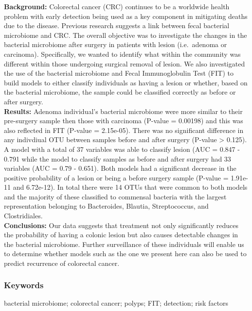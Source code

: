 \documentclass[12pt,]{article}
\begin{document}
\textbf{Background:} Colorectal cancer (CRC) continues to be a worldwide
health problem with early detection being used as a key component in
mitigating deaths due to the disease. Previous research suggests a link
between fecal bacterial microbiome and CRC. The overall objective was to
investigate the changes in the bacterial microbiome after surgery in
patients with lesion (i.e.~adenoma or carcinoma). Specifically, we
wanted to identify what within the community was different within those
undergoing surgical removal of lesion. We also investigated the use of
the bacterial microbiome and Fecal Immunoglobulin Test (FIT) to build
models to either classify individuals as having a lesion or whether,
based on the bacterial microbiome, the sample could be classified
correctly as before or after surgery.\\
\textbf{Results:} Adenoma individual's bacterial microbiome were more
similar to their pre-surgery sample then those with carcinoma (P-value =
0.00198) and this was also reflected in FIT (P-value = 2.15e-05). There
was no significant difference in any indivdiual OTU between samples
before and after surgery (P-value \textgreater{} 0.125). A model with a
total of 37 variables was able to classify lesion (AUC = 0.847 - 0.791
while the model to classify samples as before and after surgery had 33
variables (AUC = 0.79 - 0.651). Both models had a significant decrease
in the positive probability of a lesion or being a before surgery sample
(P-value = 1.91e-11 and 6.72e-12). In total there were 14 OTUs that were
common to both models and the majority of these classified to commensal
bacteria with the largest representation belonging to Bacteroides,
Blautia, Streptococcus, and Clostridiales.\\
\textbf{Conclusions:} Our data suggests that treatment not only
significantly reduces the probability of having a colonic lesion but
also causes detectable changes in the bacterial microbiome. Further
surveillance of these individuals will enable us to determine whether
models such as the one we present here can also be used to predict
recurrence of colorectal cancer.

\newpage

\subsubsection{Keywords}\label{keywords}

bacterial microbiome; colorectal cancer; polyps; FIT; detection; risk
factors
\end{document}
